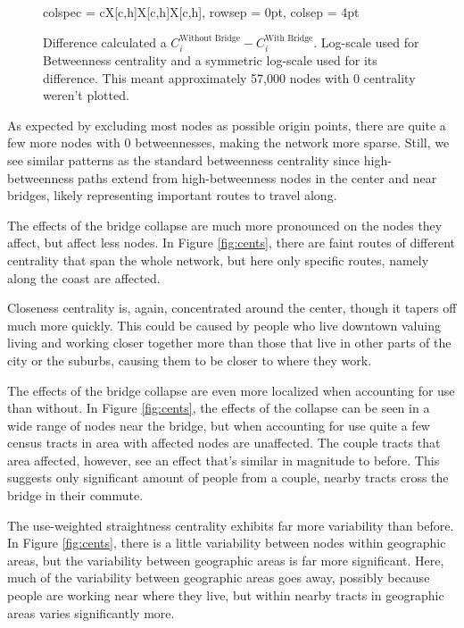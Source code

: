 \documentclass[11pt]{article}
\numberwithin{equation}{section} %
\numberwithin{figure}{section} %
\numberwithin{table}{section} %
\theoremstyle{definition}
\begin{document}
\begin{figure}[b!]
\begin{tblr}{%
    colspec = {cX[c,h]X[c,h]X[c,h]},
    rowsep = 0pt,
    colsep = 4pt
    }
  \end{tblr}
  {\footnotesize Difference calculated a $C_i^\text{Without Bridge} - C_i^\text{With Bridge}$. Log-scale used for Betweenness centrality and a symmetric log-scale used for its difference. This meant approximately 57,000 nodes with 0 centrality weren't plotted. \\}
  \label{fig:use_cents}
\end{figure}

As expected by excluding most nodes as possible origin points, there are quite a few more nodes with 0 betweennesses, making the network more sparse. Still, we see similar patterns as the standard betweenness centrality since high-betweenness paths extend from high-betweenness nodes in the center and near bridges, likely representing important routes to travel along.

The effects of the bridge collapse are much more pronounced on the nodes they affect, but affect less nodes. In Figure \ref{fig:cents}, there are faint routes of different centrality that span the whole network, but here only specific routes, namely along the coast are affected.

Closeness centrality is, again, concentrated around the center, though it tapers off much more quickly. This could be caused by people who live downtown valuing living and working closer together more than those that live in other parts of the city or the suburbs, causing them to be closer to where they work.

The effects of the bridge collapse are even more localized when accounting for use than without. In Figure \ref{fig:cents}, the effects of the collapse can be seen in a wide range of nodes near the bridge, but when accounting for use quite a few census tracts in area with affected nodes are unaffected. The couple tracts that area affected, however, see an effect that's similar in magnitude to before. This suggests only significant amount of people from a couple, nearby tracts cross the bridge in their commute.

The use-weighted straightness centrality exhibits far more variability than before. In Figure \ref{fig:cents}, there is a little variability between nodes within geographic areas, but the variability between geographic areas is far more significant. Here, much of the variability between geographic areas goes away, possibly because people are working near where they live, but within nearby tracts in geographic areas varies significantly more.
\end{document}
